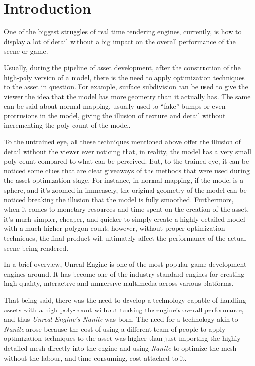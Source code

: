 \documentclass[10pt,journal,compsoc]{IEEEtran}
\begin{document}
\section{Introduction}\label{sec:intro}

One of the biggest struggles of real time rendering engines, currently, is how to display a lot of detail without a big impact on the overall performance of the scene or game.

\par Usually, during the pipeline of asset development, after the construction of the high-poly version of a model, there is the need to apply optimization techniques to the asset in question. For example, surface subdivision can be used to give the viewer the idea that the model has more geometry than it actually has. The same can be said about normal mapping, usually used to “fake” bumps or even protrusions in the model, giving the illusion of texture and detail without incrementing the poly count of the model. 

\par To the untrained eye, all these techniques mentioned above offer the illusion of detail without the viewer ever noticing that, in reality, the model has a very small poly-count compared to what can be perceived. But, to the trained eye, it can be noticed some clues that are clear giveaways of the methods that were used during the asset optimization stage. For instance, in normal mapping, if the model is a sphere, and it's zoomed in immensely, the original geometry of the model can be noticed breaking the illusion that the model is fully smoothed. Furthermore, when it comes to monetary resources and time spent on the creation of the asset, it's much simpler, cheaper, and quicker to simply create a highly detailed model with a much higher polygon count; however, without proper optimization techniques, the final product will ultimately affect the performance of the actual scene being rendered. 

\par In a brief overview, Unreal Engine is one of the most popular game development engines around. It has become one of the industry standard engines for creating high-quality, interactive and immersive multimedia across various platforms. 

\par That being said, there was the need to develop a technology capable of handling assets with a high poly-count without tanking the engine's overall performance, and thus \textit{Unreal Engine's Nanite} was born. The need for a technology akin to \textit{Nanite} arose because the cost of using a different team of people to apply optimization techniques to the asset was higher than just importing the highly detailed mesh directly into the engine and using \textit{Nanite} to optimize the mesh without the labour, and time-consuming, cost attached to it.
\end{document}
